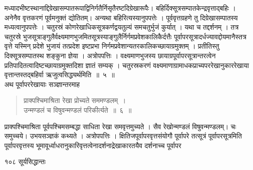 \documentclass[11pt, openany]{book}
\begin{document}
\begin{sloppypar}
मध्यादभीष्टस्थानाद्दिग्रेखासम्पातरूपाद्विनिर्गतैर्निसृतैरष्टदिग्रेखारूपैः। बहिर्दिक्सूत्रसम्पातकेन्द्रवृत्ताद्बहिः । अनेनैव वृत्तकरणं पूर्वमनुक्तं द्योतितम्। अन्यथा बहिरित्यस्यानुपपत्तेः । पूर्ववृत्तग्रहणे तु दिग्रेखासम्पातस्य मध्यत्वानुपपत्तेः । चतुरस्रं कोणरेखाधिकसूत्रकर्णद्वयतुल्यं समचतुर्भुजं कुर्यात् । यथा च तद्दर्शनम् । तत्र चतुरस्रे भुजसूत्राङ्गुलैर्वक्ष्यमाणभुजमितसूत्रस्याङ्गुलैर्निर्गमप्रवेशकालिकैर्दत्तैः पूर्वापरसूत्रादर्धज्यावद्दोयमानैस्तत्र वृत्ते यस्मिन् प्रदेशे भुजायं तत्प्रदेश इष्टप्रभा निर्गमप्रवेशान्यतरकालिकच्छायाग्रमुक्तम् । प्रतीतिस्तु दिक्सूत्रसम्पातस्थ शङ्कुना ज्ञेया । अत्रोपपत्तिः । वक्ष्यमाणभुजस्य छायाग्रपूर्वापरसूत्रान्तरत्वेन प्रतिपादितत्वादिष्टच्छायाग्रमुक्तदिशा ज्ञातं सम्यक् । चतुरस्रकरणं वक्ष्यमाणाग्रामाधकप्राच्यपररेखानुकाररेखाया वृत्तान्तस्तद्बहिर्वा ऋजुत्वसिद्ध्यर्थमिति~॥~५~॥\\
\noindent अथ पूर्वापररेखायाः सञ्ज्ञान्तरमाह\textendash
\end{sloppypar}
\begin{quote}

  {\ssi प्राक्पश्चिमाश्रिता रेखा प्रोच्यते सममण्डलम्~।\\
 उन्मण्डलं च विषुवन्मण्डलं परिकीर्त्यते~॥~६~॥}
\end{quote}
\begin{sloppypar}
 प्राक्पश्चिमाश्रिता पूर्वपश्चिमसम्बद्धा साधिता रेखा समवृत्तमुच्यते । सैव रेखोन्मण्डलं विषुवन्मण्डलम्। चः समुच्चये। उभयसञ्ज्ञकं कथ्यते । अत्रोपपत्तिः । क्षितिजपूर्वापरवृत्तसंयोगौ पूर्वापरे तत्सूत्रं पूर्वापरसूत्रमिति पूर्वापरवृत्तस्य भूमावूर्ध्वाधरानुकारिवृत्तत्वेनादर्शनाद्रेखाकारतयैव दर्शनाच्च पूर्वापर\textendash
\end{sloppypar}

\newpage


\noindent १०८ \hspace{4cm} सूर्यसिद्धान्तः 
\vspace{1cm}
\end{document}
